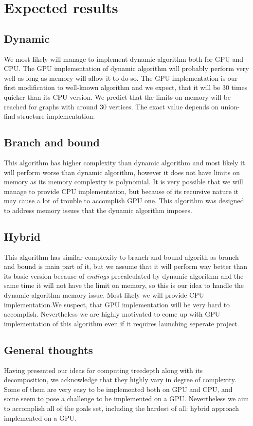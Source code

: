 \section{Expected results}

\subsection{Dynamic}
We most likely will manage to implement dynamic algorithm both for GPU and CPU. The GPU implementation of dynamic algorithm will probably perform very well as long as memory will allow it to do so. The GPU implementation is our first modification to well-known algorithm and we expect, that it will be 30 times quicker than its CPU version. We predict that the limits on memory will be reached for graphs with around 30 vertices. The exact value depends on union-find structure implementation.

\subsection{Branch and bound}
This algorithm has higher complexity than dynamic algorithm and most likely it will perform worse than dynamic algorithm, however it does not have limits on memory as its memory complexity is polynomial. It is very possible that we will manage to provide CPU implementation, but because of its recursive nature it may cause a lot of trouble to accomplish GPU one. This algorithm was designed to address memory issues that the dynamic algorithm imposes.

\subsection{Hybrid}
This algorithm has similar complexity to branch and bound algorith as branch and bound is main part of it, but we assume that it will perform way better than its basic version because of
\emph{endings} %
precalculated by dynamic algorithm and the same time it will not have the limit on memory, so this is our idea to handle the dynamic algorithm memory issue. Most likely we will provide CPU implementation.We suspect, that GPU implementation will be very hard to accomplish. Nevertheless we are highly motivated to come up with GPU implementation of this algorithm even if it requires launching seperate project.

\subsection{General thoughts}
Having presented our ideas for computing treedepth along with its decomposition, we acknowledge that they highly vary in degree of complexity. Some of them are very easy to be implemented both on GPU and CPU, and some seem to pose a challenge to be implemented on a GPU. Nevertheless we aim to accomplish all of the goals set, including the hardest of all: hybrid approach implemented on a GPU.
